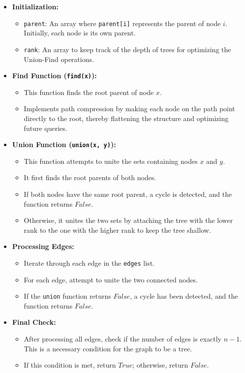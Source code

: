 \begin{itemize}
    \item \textbf{Initialization:}
    \begin{itemize}
        \item \texttt{parent}: An array where \texttt{parent[i]} represents the parent of node \( i \). Initially, each node is its own parent.
        \item \texttt{rank}: An array to keep track of the depth of trees for optimizing the Union-Find operations.
    \end{itemize}
    
    \item \textbf{Find Function (\texttt{find(x)}):}
    \begin{itemize}
        \item This function finds the root parent of node \( x \).
        \item Implements path compression by making each node on the path point directly to the root, thereby flattening the structure and optimizing future queries.
    \end{itemize}
    
    \item \textbf{Union Function (\texttt{union(x, y)}):}
    \begin{itemize}
        \item This function attempts to unite the sets containing nodes \( x \) and \( y \).
        \item It first finds the root parents of both nodes.
        \item If both nodes have the same root parent, a cycle is detected, and the function returns \( False \).
        \item Otherwise, it unites the two sets by attaching the tree with the lower rank to the one with the higher rank to keep the tree shallow.
    \end{itemize}
    
    \item \textbf{Processing Edges:}
    \begin{itemize}
        \item Iterate through each edge in the \texttt{edges} list.
        \item For each edge, attempt to unite the two connected nodes.
        \item If the \texttt{union} function returns \( False \), a cycle has been detected, and the function returns \( False \).
    \end{itemize}
    
    \item \textbf{Final Check:}
    \begin{itemize}
        \item After processing all edges, check if the number of edges is exactly \( n - 1 \). This is a necessary condition for the graph to be a tree.
        \item If this condition is met, return \( True \); otherwise, return \( False \).
    \end{itemize}
\end{itemize}

